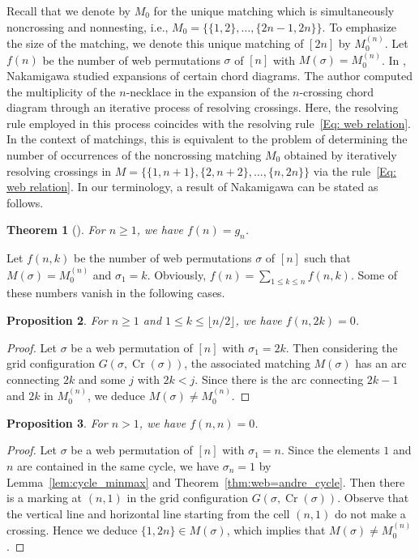 \documentclass[reqno,12pt]{amsart}
\newtheorem{thm}{Theorem}[section]
\newtheorem{prop}[thm]{Proposition}
\theoremstyle{definition}
\theoremstyle{remark}
\newcommand\Cr{\operatorname{Cr}}
\begin{document}
Recall that we denote by \( M_0 \) for the unique matching which
is simultaneously noncrossing and nonnesting, i.e.,
\( M_0 = \{ \{1,2\},\dots,\{2n-1,2n\} \} \).
To emphasize the size of the matching, we denote this unique matching of $[2n]$
by $M^{(n)}_0$. Let $f(n)$ be the number of web permutations $\sigma$ of $[n]$
with $M(\sigma)=M^{(n)}_0$.
In \cite{Nak20}, Nakamigawa studied expansions of certain chord diagrams.
The author computed the multiplicity of the \( n \)-necklace
in the expansion of the \( n \)-crossing chord diagram through an iterative
process of resolving crossings.
Here, the resolving rule employed in this process coincides with the resolving
rule~\eqref{Eq: web relation}.
In the context of matchings, this is equivalent to the problem of determining
the number of occurrences of the noncrossing matching \( M_0 \) obtained by
iteratively resolving crossings in \( M = \{\{1,n+1\},\{2,n+2\},\dots,\{n,2n\}\}
\) via the rule~\eqref{Eq: web relation}.
In our terminology, a result of Nakamigawa can be stated as follows.

\begin{thm}[{\cite[Theorem 3.1]{Nak20}}] \label{thm:Geno}
  For \( n\ge 1 \), we have \( f(n)=g_n \).
\end{thm}
Let $f(n,k)$ be the number of web permutations $\sigma$ of $[n]$ such that
\( M(\sigma) = M^{(n)}_0 \) and $\sigma_1=k$.
Obviously, \( f(n)=\sum_{1\le k\le n} f(n,k) \).
Some of these numbers vanish in the following cases.
\begin{prop}\label{prop:web-Genocchi even k=0}
  For $n\ge1$ and $1\le k \le \lfloor n/2\rfloor$, we have $f(n,2k)=0$.  
\end{prop}
\begin{proof}
  Let $\sigma$ be a web permutation of $[n]$ with $\sigma_1=2k$.
  Then considering the grid configuration \( G(\sigma,\Cr(\sigma)) \),
  the associated matching $M(\sigma)$ has an arc connecting $2k$
  and some $j$ with $2k<j$. Since there is the arc connecting $2k-1$ and $2k$
  in $M^{(n)}_0$, we deduce $M(\sigma)\neq M^{(n)}_0$.
\end{proof}

\begin{prop}\label{prop:web-Genocchi odd n,n=0}
  For $n>1$, we have $f(n,n)=0$. 
\end{prop}
\begin{proof}
  Let $\sigma$ be a web permutation of $[n]$ with $\sigma_1=n$.
  Since the elements \( 1 \) and \( n \) are contained in the same cycle, we have
  \( \sigma_n = 1 \) by Lemma~\ref{lem:cycle_minmax} and
  Theorem~\ref{thm:web=andre_cycle}. Then there is a marking at $(n,1)$
  in the grid configuration \( G(\sigma,\Cr(\sigma)) \).
  Observe that the vertical line and horizontal line starting from
  the cell $(n,1)$ do not make a crossing.
  Hence we deduce $\{1,2n\}\in M(\sigma)$,
  which implies that $M(\sigma)\neq M^{(n)}_0$.
\end{proof}
\end{document}
